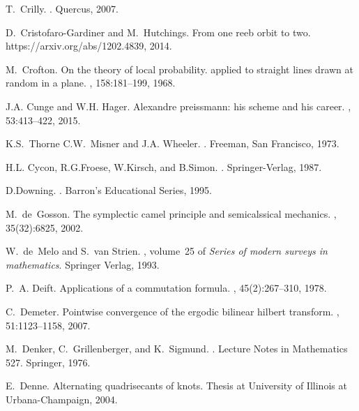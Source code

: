 \documentclass[12pt]{amsart}
\begin{document}
\begin{thebibliography}{100}
T.~Crilly.
.
\newblock Quercus, 2007.

D.~Cristofaro-Gardiner and M.~Hutchings.
\newblock From one reeb orbit to two.
\newblock https://arxiv.org/abs/1202.4839, 2014.

M.~Crofton.
\newblock On the theory of local probability. applied to straight lines drawn
  at random in a plane.
,
  158:181--199, 1968.

J.A. Cunge and W.H. Hager.
\newblock Alexandre preissmann: his scheme and his career.
, 53:413--422, 2015.

K.S.~Thorne C.W.~Misner and J.A. Wheeler.
.
\newblock Freeman, San Francisco, 1973.

H.L. Cycon, R.G.Froese, W.Kirsch, and B.Simon.
.
\newblock Springer-Verlag, 1987.

D.Downing.
.
\newblock Barron's Educational Series, 1995.

M.~de~Gosson.
\newblock The symplectic camel principle and semicalssical mechanics.
, 35(32):6825,
  2002.

W.~de~Melo and S.~van Strien.
, volume~25 of {\em Series of modern
  surveys in mathematics}.
\newblock Springer Verlag, 1993.

P.~A. Deift.
\newblock Applications of a commutation formula.
, 45(2):267--310, 1978.

C.~Demeter.
\newblock Pointwise convergence of the ergodic bilinear hilbert transform.
, 51:1123--1158, 2007.

M.~Denker, C.~Grillenberger, and K.~Sigmund.
.
\newblock Lecture Notes in Mathematics 527. Springer, 1976.

E.~Denne.
\newblock Alternating quadrisecants of knots.
\newblock Thesis at University of Illinois at Urbana-Champaign, 2004.


\end{thebibliography}
\end{document}
